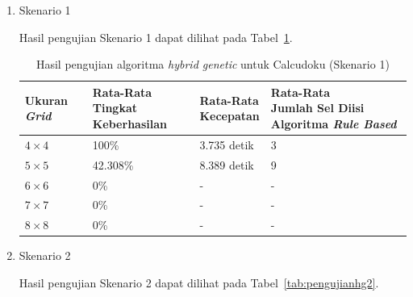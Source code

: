\begin{enumerate}
\item Skenario 1

Hasil pengujian Skenario 1 dapat dilihat pada Tabel~\ref{tab:pengujianhg1}.

\begin{table}
\centering
\captionsetup{justification=centering}
\caption[Hasil pengujian algoritma \textit{hybrid genetic} untuk Calcudoku (Skenario 1)]{Hasil pengujian algoritma \textit{hybrid genetic} untuk Calcudoku (Skenario 1)}
\begin{tabular}{| l | l | l | l |}
\hline
Ukuran \textit{Grid} & \makecell[c]{Rata-Rata \\ Tingkat Keberhasilan} & \makecell[c]{Rata-Rata \\ Kecepatan} & \makecell[c]{Rata-Rata \\ Jumlah Sel Diisi Algoritma \textit{Rule Based}} \\
\hline \hline
\begin{math}4 \times 4\end{math} & 100\% & 3.735 detik & 3 \\
\hline
\begin{math}5 \times 5\end{math} & 42.308\% & 8.389 detik & 9 \\
\hline
\begin{math}6 \times 6\end{math} & 0\% & - & - \\
\hline
\begin{math}7 \times 7\end{math} & 0\% & - & - \\
\hline
\begin{math}8 \times 8\end{math} & 0\% & - & - \\
\hline
\end{tabular}
\label{tab:pengujianhg1}
\end{table}

\item Skenario 2

Hasil pengujian Skenario 2 dapat dilihat pada Tabel~\ref{tab:pengujianhg2}.


\end{enumerate}
